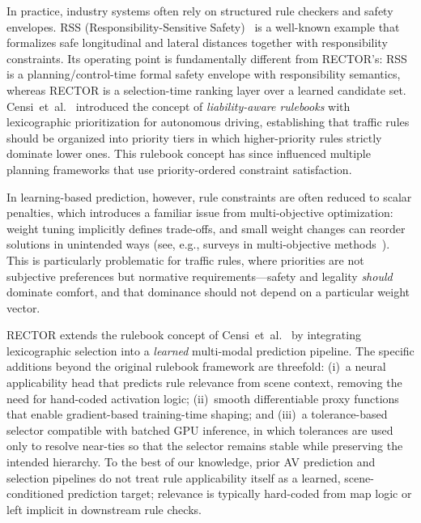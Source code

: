 In practice, industry systems often rely on structured rule checkers and safety envelopes.  RSS (Responsibility-Sensitive Safety)~\cite{shalev2017formal} is a well-known example that formalizes safe longitudinal and lateral distances together with responsibility constraints.  Its operating point is fundamentally different from RECTOR's: RSS is a planning/control-time formal safety envelope with responsibility semantics, whereas RECTOR is a selection-time ranking layer over a learned candidate set.  Censi~et~al.~\cite{censi2019liability} introduced the concept of \emph{liability-aware rulebooks} with lexicographic prioritization for autonomous driving, establishing that traffic rules should be organized into priority tiers in which higher-priority rules strictly dominate lower ones.  This rulebook concept has since influenced multiple planning frameworks that use priority-ordered constraint satisfaction.

In learning-based prediction, however, rule constraints are often reduced to scalar penalties, which introduces a familiar issue from multi-objective optimization: weight tuning implicitly defines trade-offs, and small weight changes can reorder solutions in unintended ways (see, e.g., surveys in multi-objective methods~\cite{marler2004survey}).  This is particularly problematic for traffic rules, where priorities are not subjective preferences but normative requirements---safety and legality \emph{should} dominate comfort, and that dominance should not depend on a particular weight vector.

RECTOR extends the rulebook concept of Censi~et~al.~\cite{censi2019liability} by integrating lexicographic selection into a \emph{learned} multi-modal prediction pipeline.  The specific additions beyond the original rulebook framework are threefold: (i)~a neural applicability head that predicts rule relevance from scene context, removing the need for hand-coded activation logic; (ii)~smooth differentiable proxy functions that enable gradient-based training-time shaping; and (iii)~a tolerance-based selector compatible with batched GPU inference, in which tolerances are used only to resolve near-ties so that the selector remains stable while preserving the intended hierarchy.  To the best of our knowledge, prior AV prediction and selection pipelines do not treat rule applicability itself as a learned, scene-conditioned prediction target; relevance is typically hard-coded from map logic or left implicit in downstream rule checks.


